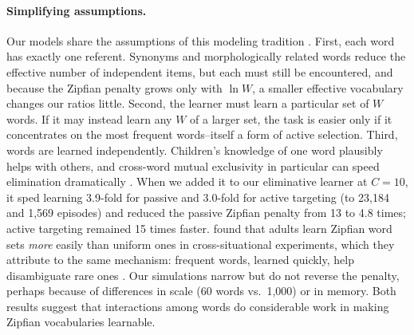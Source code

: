 \documentclass[a4paper,natbib,man]{apa6}
\begin{document}
\paragraph{Simplifying assumptions.} Our models share the assumptions of this modeling tradition \citep{Blythe:2010,Vogt:2012,Blythe:2016}. First, each word has exactly one referent. Synonyms and morphologically related words reduce the effective number of independent items, but each must still be encountered, and because the Zipfian penalty grows only with $\ln W$, a smaller effective vocabulary changes our ratios little. Second, the learner must learn a particular set of $W$ words. If it may instead learn any $W$ of a larger set, the task is easier only if it concentrates on the most frequent words--itself a form of active selection. Third, words are learned independently. Children's knowledge of one word plausibly helps with others, and cross-word mutual exclusivity in particular can speed elimination dramatically \citep{Reisenauer:2013}. When we added it to our eliminative learner at $C=10$, it sped learning 3.9-fold for passive and 3.0-fold for active targeting (to 23,184 and 1,569 episodes) and reduced the passive Zipfian penalty from 13 to 4.8 times; active targeting remained 15 times faster. \cite{Hendrickson:2019} found that adults learn Zipfian word sets \textit{more} easily than uniform ones in cross-situational experiments, which they attribute to the same mechanism: frequent words, learned quickly, help disambiguate rare ones \citep[see also][]{Wolters:2024}. Our simulations narrow but do not reverse the penalty, perhaps because of differences in scale (60 words vs.\ 1,000) or in memory. Both results suggest that interactions among words do considerable work in making Zipfian vocabularies learnable.
\end{document}
